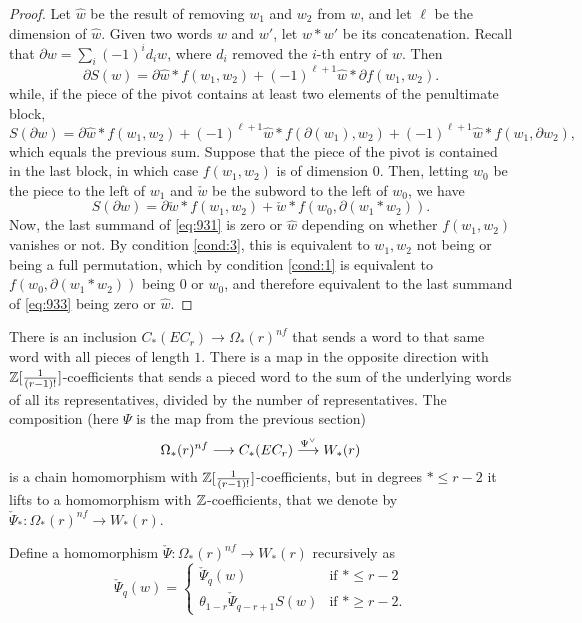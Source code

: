 \begin{proof}
	Let $\hat{w}$ be the result of removing $w_1$ and $w_2$ from $w$, and let $\ell$ be the dimension of $\hat{w}$. Given two words $w$ and $w'$, let $w*w'$ be its concatenation. Recall that $\partial w = \sum_{i} (-1)^{i}d_iw$, where $d_i$ removed the $i$-th entry of $w$. Then
	\begin{equation}\label{eq:931}
		\partial S(w) = \partial \hat{w}*f(w_1,w_2) + (-1)^{\ell+1}\hat{w}*\partial f(w_1,w_2).
	\end{equation}
	while, if the piece of the pivot contains at least two elements of the penultimate block,
	\[S(\partial w) = \partial \hat{w}*f(w_1,w_2) + (-1)^{\ell+1}\hat{w}*f(\partial(w_1),w_2) + (-1)^{\ell+1}\hat{w}*f(w_1,\partial w_2),\]
	which equals the previous sum. Suppose that the piece of the pivot is contained in the last block, in which case $f(w_1,w_2)$ is of dimension $0$. Then, letting $w_0$ be the piece to the left of $w_1$ and $\check{w}$ be the subword to the left of $w_0$, we have
	\begin{equation}\label{eq:933}
		S(\partial w) = \partial \check{w}*f(w_1,w_2) + \check{w}*f(w_0,\partial(w_1*w_2)).
	\end{equation}
	Now, the last summand of \eqref{eq:931} is zero or $\hat{w}$ depending on whether $f(w_1,w_2)$ vanishes or not. By condition \eqref{cond:3}, this is equivalent to $w_1,w_2$ not being or being a full permutation, which by condition \eqref{cond:1} is equivalent to $f(w_0,\partial(w_1*w_2))$ being $0$ or $w_0$, and therefore equivalent to the last summand of \eqref{eq:933} being zero or $\hat{w}$.
\end{proof}

There is an inclusion $C_*(EC_r)\to \Omega_*(r)^{nf}$ that sends a word to that same word with all pieces of length $1$. There is a map in the opposite direction with $\mathbb{Z}[\frac{1}{(r-1)!}]$-coefficients that sends a pieced word to the sum of the underlying words of all its representatives, divided by the number of representatives. The composition (here $\Psi$ is the map from the previous section)
\begin{equation} \label{eq:234}
	\Omega_*(r)^{nf}\longrightarrow C_*(EC_r)\overset{\Psi^\vee}{\longrightarrow} W_*(r)
\end{equation}
is a chain homomorphism with $\mathbb{Z}[\frac{1}{(r-1)!}]$-coefficients, but in degrees $*\leq r-2$ it lifts to a homomorphism with $\mathbb{Z}$-coefficients, that we denote by $\check{\Psi}_*\colon \Omega_*(r)^{nf}\to W_*(r)$.

\begin{definition}
	Define a homomorphism $\check{\Psi}\colon \Omega_*(r)^{nf}\to W_*(r)$ recursively as
	\[\check{\Psi}_q(w) = \begin{cases} \check{\Psi}_q(w) & \text{if $*\leq r-2$} \\
		\theta_{1-r}\check{\Psi}_{q-r+1}S(w) & \text{if $*\geq r-2$.}\end{cases}\]
\end{definition}

